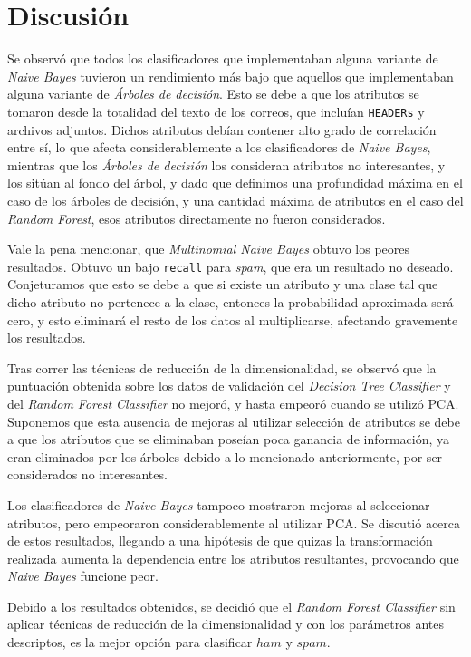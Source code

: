 \section{Discusión}


Se observ\'o que todos los clasificadores que implementaban alguna variante de \emph{Naive Bayes} tuvieron un rendimiento m\'as bajo que aquellos que implementaban alguna variante de \emph{\'Arboles de decisi\'on}. Esto se debe a que los atributos se tomaron desde la totalidad del texto de los correos, que inclu\'ian \texttt{HEADERs} y archivos adjuntos. Dichos atributos deb\'ian contener alto grado de correlaci\'on entre s\'i, lo que afecta considerablemente a los clasificadores de \emph{Naive Bayes}, mientras que los \emph{\'Arboles de decisi\'on} los consideran atributos no interesantes, y los sit\'uan al fondo del \'arbol, y dado que definimos una profundidad m\'axima en el caso de los \'arboles de decisi\'on, y una cantidad m\'axima de atributos en el caso del \emph{Random Forest}, esos atributos directamente no fueron considerados.

Vale la pena mencionar, que \emph{Multinomial Naive Bayes} obtuvo los peores resultados. Obtuvo un bajo \texttt{recall} para \emph{spam}, que era un resultado no deseado. Conjeturamos que esto se debe a que si existe un atributo y una clase tal que dicho atributo no pertenece a la clase, entonces la probabilidad aproximada ser\'a cero, y esto eliminar\'a el resto de los datos al multiplicarse\textsuperscript{\cite{multiproblem}}, afectando gravemente los resultados.


Tras correr las t\'ecnicas de reducci\'on de la dimensionalidad, se observ\'o que la puntuaci\'on obtenida sobre los datos de validaci\'on del \emph{Decision Tree Classifier} y del \emph{Random Forest Classifier} no mejor\'o, y hasta empeor\'o cuando se utiliz\'o PCA. Suponemos que esta ausencia de mejoras al utilizar selecci\'on de atributos se debe a que los atributos que se eliminaban pose\'ian poca ganancia de informaci\'on, ya eran eliminados por los \'arboles debido a lo mencionado anteriormente, por ser considerados no interesantes.

Los clasificadores de \emph{Naive Bayes} tampoco mostraron mejoras al seleccionar atributos, pero empeoraron considerablemente al utilizar PCA. Se discuti\'o acerca de estos resultados, llegando a una hip\'otesis de que quizas la transformaci\'on realizada aumenta la dependencia entre los atributos resultantes, provocando que \emph{Naive Bayes} funcione peor.



Debido a los resultados obtenidos, se decidi\'o que el \emph{Random Forest Classifier} sin aplicar t\'ecnicas de reducci\'on de la dimensionalidad y con los par\'ametros antes descriptos, es la mejor opci\'on para clasificar $ham$ y $spam$.
